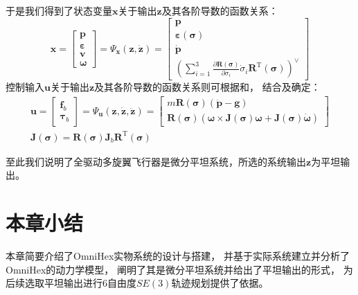 于是我们得到了状态变量$\bm{x}$关于输出$\bm{z}$及其各阶导数的函数关系：
\begin{equation}
    \bm{x} = 
    \begin{bmatrix}
        \bm{p} \\ \bm{\varepsilon} \\ \bm{v} \\ \bm{\omega}
    \end{bmatrix} = 
    \bm{\varPsi}_{\bm{x}}(\bm{z}, \dot{\bm{z}}) = 
    \begin{bmatrix}
        \bm{p} \\ \bm{\varepsilon}(\bm{\sigma}) \\ \dot{\bm{p}} \\ 
        \left(
        \sum_{i=1}^3 \frac{\partial \bm{R}(\bm{\sigma})}{\partial \sigma_i}\dot{\sigma}_i\bm{R}^{\text{T}}(\bm{\sigma})
        \right)^{\vee}
    \end{bmatrix}
    \label{equ:Psi_x}
\end{equation}
控制输入$\bm{u}$关于输出$\bm{z}$及其各阶导数的函数关系则可根据和，
结合及确定：
\begin{gather}
    \bm{u} = 
    \begin{bmatrix}
        \bm{f}_b \\ \bm{\tau}_b
    \end{bmatrix} = 
    \bm{\varPsi}_{\bm{u}}(\bm{z}, \dot{\bm{z}}, \ddot{\bm{z}}) = 
    \begin{bmatrix}
        m\bm{R}(\bm{\sigma})(\ddot{\bm{p}} - \bm{g}) \\ 
        \bm{R}(\bm{\sigma})(\bm{\omega} \times \bm{J}(\bm{\sigma})\bm{\omega} + \bm{J}(\bm{\sigma})\dot{\bm{\omega}})
    \end{bmatrix} \label{equ:Psi_u}\\ 
    \bm{J}(\bm{\sigma}) = \bm{R}(\bm{\sigma})\bm{J}_b\bm{R}^{\text{T}}(\bm{\sigma}) \label{sigma_to_J}
\end{gather}

至此我们说明了全驱动多旋翼飞行器是微分平坦系统，所选的系统输出$\bm{z}$为平坦输出。


\section{本章小结}\label{sec:summary_2}
本章简要介绍了OmniHex实物系统的设计与搭建，
并基于实际系统建立并分析了OmniHex的动力学模型，
阐明了其是微分平坦系统并给出了平坦输出的形式，
为后续选取平坦输出进行6自由度$SE(3)$轨迹规划提供了依据。

